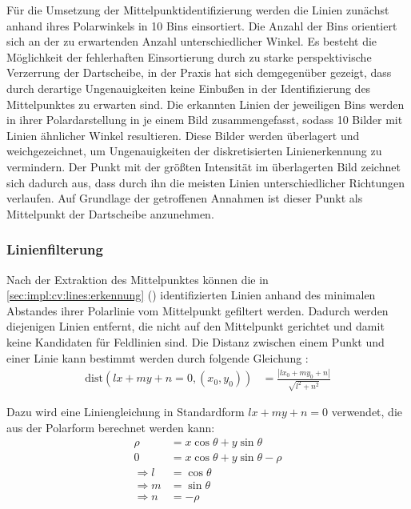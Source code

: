 Für die Umsetzung der Mittelpunktidentifizierung werden die Linien zunächst anhand ihres Polarwinkels in 10 Bins einsortiert. Die Anzahl der Bins orientiert sich an der zu erwartenden Anzahl unterschiedlicher Winkel. Es besteht die Möglichkeit der fehlerhaften Einsortierung durch zu starke perspektivische Verzerrung der Dartscheibe, in der Praxis hat sich demgegenüber gezeigt, dass durch derartige Ungenauigkeiten keine Einbußen in der Identifizierung des Mittelpunktes zu erwarten sind. Die erkannten Linien der jeweiligen Bins werden in ihrer Polardarstellung in je einem Bild zusammengefasst, sodass 10 Bilder mit Linien ähnlicher Winkel resultieren. Diese Bilder werden überlagert und weichgezeichnet, um Ungenauigkeiten der diskretisierten Linienerkennung zu vermindern. Der Punkt mit der größten Intensität im überlagerten Bild zeichnet sich dadurch aus, dass durch ihn die meisten Linien unterschiedlicher Richtungen verlaufen. Auf Grundlage der getroffenen Annahmen ist dieser Punkt als Mittelpunkt der Dartscheibe anzunehmen.

\subsubsection{Linienfilterung}
\label{sec:impl:cv:lines:filter}

Nach der Extraktion des Mittelpunktes können die in \autoref{sec:impl:cv:lines:erkennung} () identifizierten Linien anhand des minimalen Abstandes ihrer Polarlinie vom Mittelpunkt gefiltert werden. Dadurch werden diejenigen Linien entfernt, die nicht auf den Mittelpunkt gerichtet und damit keine Kandidaten für Feldlinien sind. Die Distanz zwischen einem Punkt und einer Linie kann bestimmt werden durch folgende Gleichung \cite{point_line_distance}:
\begin{align*}
    \text{dist}(lx + my + n = 0, (x_0, y_0)) & = \frac{| l x_0 + m y_0 + n|}{\sqrt{l^2+n^2}}
\end{align*}

Dazu wird eine Liniengleichung in Standardform $ lx + my + n = 0 $ verwendet, die aus der Polarform berechnet werden kann:
\begin{align*}
    \rho          & = x \cos{\theta} + y \sin{\theta}        \\
    0             & = x \cos{\theta} + y \sin{\theta} - \rho \\
    \Rightarrow l & = \cos{\theta}                           \\
    \Rightarrow m & = \sin{\theta}                           \\
    \Rightarrow n & = -\rho
\end{align*}

